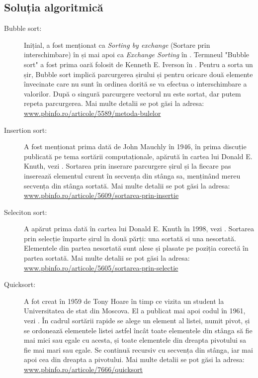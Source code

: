 \documentclass[12pt]{article}
\begin{document}
\subsection{Soluția algoritmică}
\begin{itemize}
\begin{description}
    \item[Bubble sort:]  Inițial, a fost menționat ca \emph{Sorting by exchange} (Sortare  prin interschimbare) în \cite{Friend1956SortingOE, 10.1145/366552.366555}  și mai apoi ca \emph{Exchange Sorting} în \cite{10.1145/321119.321126, johnson_1960}. Termneul "Bubble sort" a fost prima oară folosit de Kenneth E. Iverson în \cite{10.5555/1098666}. Pentru a sorta un șir, Bubble sort implică parcurgerea șirului și pentru oricare două elemente învecinate care nu sunt în ordinea dorită se va efectua o interschimbare a valorilor. După o singură parcurgere vectorul nu este sortat, dar putem repeta parcurgerea. Mai multe detalii se pot găsi la adresa:\\ \url{www.pbinfo.ro/articole/5589/metoda-bulelor}
    
    \item[Insertion sort:]  A fost menționat prima dată de John Mauchly în 1946, în prima discuție publicată pe tema sortării computaționale, apărută în cartea lui Donald E. Knuth, vezi \cite{10.5555/280635}. Sortarea prin inserare parcurgere șirul și la fiecare pas inserează elementul curent în secvența din stânga sa, menținând mereu secvența din stânga sortată. Mai multe detalii se pot găsi la adresa:\\ \url{www.pbinfo.ro/articole/5609/sortarea-prin-insertie}
    
    \item[Seleciton sort:]  A apărut prima dată în cartea lui Donald E. Knuth în 1998, vezi \cite{10.5555/280635}. Sortarea prin selecție împarte șirul în două părți: una sortată si una nesortată. Elementele din partea nesortată sunt alese și plasate pe poziția corectă în partea sortată. Mai multe detalii se pot găsi la adresa:\\ \url{www.pbinfo.ro/articole/5605/sortarea-prin-selectie}
    
    \item[Quicksort:] A fot creat în 1959 de Tony Hoare în timp ce vizita un student la Universitatea de stat din Moscova. El a publicat mai apoi codul în 1961, vezi \cite{10.1145/366622.366644}. În cadrul sortării rapide se alege un element al listei, numit pivot, și se ordonează elementele listei astfel încât toate elementele din stânga să fie mai mici sau egale cu acesta, și toate elementele din dreapta pivotului sa fie mai mari sau egale. Se continuă recursiv cu secvența din stânga, iar mai apoi cea din dreapta a pivotului. Mai multe detalii se pot găsi la adresa:\\ \url{www.pbinfo.ro/articole/7666/quicksort}
    

\end{description}
\end{itemize}
\end{document}
